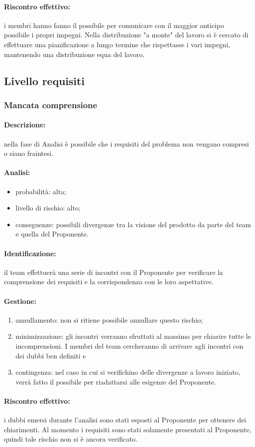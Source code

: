 \documentclass[../PianoProgetto.tex]{subfiles}
\begin{document}
	\paragraph*{Riscontro effettivo:} i membri hanno fanno il possibile per comunicare con il maggior anticipo possibile i propri impegni. Nella distribuzione "a monte" del lavoro si è cercato di effettuare una pianificazione a lungo termine che rispettasse i vari impegni, mantenendo una distribuzione equa del lavoro.


\subsection{Livello requisiti}

\subsubsection{Mancata comprensione}

	\paragraph*{Descrizione:} nella fase di Analisi è possibile che i requisiti del problema non vengano compresi o siano fraintesi.
	
	\paragraph*{Analisi:}
	\begin{itemize}
		\item probabilità: alta;
		\item livello di rischio: alto;
		\item conseguenze: possibili divergenze tra la visione del prodotto da parte del team e quella del Proponente.
	\end{itemize}	
		
	\paragraph*{Identificazione:} il team effettuerà una serie di incontri con il Proponente per verificare la comprensione dei requisiti e la corrispondenza con le loro aspettative.
	
	\paragraph*{Gestione:}
	\begin{enumerate}
		\item annullamento: non si ritiene possibile annullare questo rischio;
		\item minimizzazione: gli incontri verranno sfruttati al massimo per chiarire tutte le incomprensioni. I membri del team cercheranno di arrivare agli incontri con dei dubbi ben definiti e 
		\item contingenza: nel caso in cui si verifichino delle divergenze a lavoro iniziato, verrà fatto il possibile per riadattarsi alle esigenze del Proponente.
	\end{enumerate}	
	
	\paragraph*{Riscontro effettivo:} i dubbi emersi durante l'analisi sono stati esposti al Proponente per ottenere dei chiarimenti. Al momento i requisiti sono stati solamente presentati al Proponente, quindi tale rischio non si è ancora verificato.

			
\end{document}
